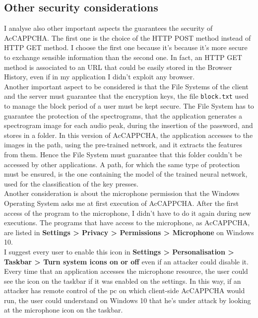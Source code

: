 \subsection{Other security considerations}
I analyse also other important aspects the guarantees the security of AcCAPPCHA. The first one is the choice of the HTTP POST method instead of HTTP GET method. I choose the first one because it's because it's more secure to exchange sensible information than the second one. In fact, an HTTP GET method is associated to an URL that could be easily stored in the Browser History, even if in my application I didn't exploit any browser.\\
Another important aspect to be considered is that the File Systems of the client and the server must guarantee that the encryption keys, the file \texttt{block.txt} used to manage the block period of a user must be kept secure. The File System has to guarantee the protection of the spectrograms, that the application generates a spectrogram image for each audio peak, during the insertion of the password, and stores in a folder. In this version of AcCAPPCHA, the application accesses to the images in the path, using the pre-trained network, and it extracts the features from them. Hence the File System must guarantee that this folder couldn't be accessed by other applications. A path, for which the same type of protection must be ensured, is the one containing the model of the trained neural network, used for the classification of the key presses.\\
Another consideration is about the microphone permission that the Windows Operating System asks me at first execution of AcCAPPCHA. After the first access of the program to the microphone, I didn't have to do it again during new executions. The programs that have access to the microphone, as AcCAPPCHA, are listed in \textbf{Settings > Privacy > Permissions > Microphone} on Windows 10.\\
I suggest every user to enable this icon in \textbf{Settings > Personalisation > Taskbar > Turn system icons on or off} even if an attacker could disable it. Every time that an application accesses the microphone resource, the user could see the icon on the taskbar if it was enabled on the settings. In this way, if an attacker has remote control of the pc on which client-side AcCAPPCHA would run, the user could understand on Windows 10 that he's under attack by looking at the microphone icon on the taskbar.\\

